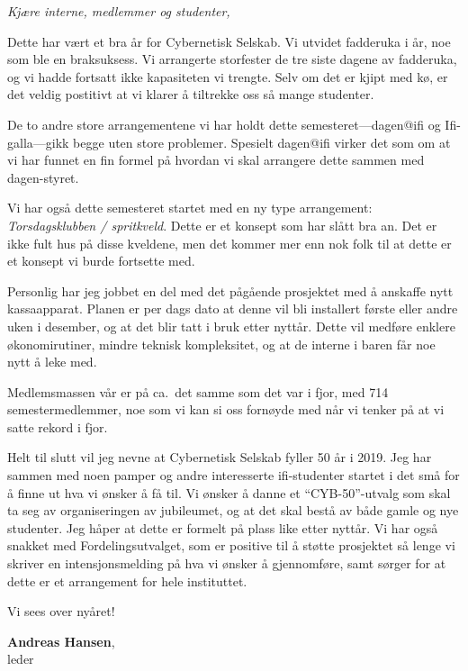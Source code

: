 \documentclass[10pt,norsk,a4paper]{article}
\begin{document}
\textit{Kjære interne, medlemmer og studenter,}
\begin{multicols}{2}

	Dette har vært et bra år for Cybernetisk Selskab. Vi utvidet fadderuka i år, noe som ble en braksuksess. Vi arrangerte storfester de tre siste dagene av fadderuka, og vi hadde fortsatt ikke kapasiteten vi trengte. Selv om det er kjipt med kø, er det veldig postitivt at vi klarer å tiltrekke oss så mange studenter.

	De to andre store arrangementene vi har holdt dette semesteret---dagen@ifi og Ifi-galla---gikk begge uten store problemer. Spesielt dagen@ifi virker det som om at vi har funnet en fin formel på hvordan vi skal arrangere dette sammen med dagen-styret.

	Vi har også dette semesteret startet med en ny type arrangement: \textit{Torsdagsklubben / spritkveld}. Dette er et konsept som har slått bra an. Det er ikke fult hus på disse kveldene, men det kommer mer enn nok folk til at dette er et konsept vi burde fortsette med.

	Personlig har jeg jobbet en del med det pågående prosjektet med å anskaffe nytt kassaapparat. Planen er per dags dato at denne vil bli installert første eller andre uken i desember, og at det blir tatt i bruk etter nyttår. Dette vil medføre enklere økonomirutiner, mindre teknisk kompleksitet, og at de interne i baren får noe nytt å leke med.

	Medlemsmassen vår er på ca.\ det samme som det var i fjor, med 714 semestermedlemmer, noe som vi kan si oss fornøyde med når vi tenker på at vi satte rekord i fjor.

	Helt til slutt vil jeg nevne at Cybernetisk Selskab fyller 50 år i 2019. Jeg har sammen med noen pamper og andre interesserte ifi-studenter startet i det små for å finne ut hva vi ønsker å få til. Vi ønsker å danne et ``CYB-50''-utvalg som skal ta seg av organiseringen av jubileumet, og at det skal bestå av både gamle og nye studenter. Jeg håper at dette er formelt på plass like etter nyttår. Vi har også snakket med Fordelingsutvalget, som er positive til å støtte prosjektet så lenge vi skriver en intensjonsmelding på hva vi ønsker å gjennomføre, samt sørger for at dette er et arrangement for hele instituttet.

	Vi sees over nyåret!

	\textbf{Andreas Hansen},\\
	leder \\
	\date{10.\ november 2017}
\end{multicols}
\end{document}
